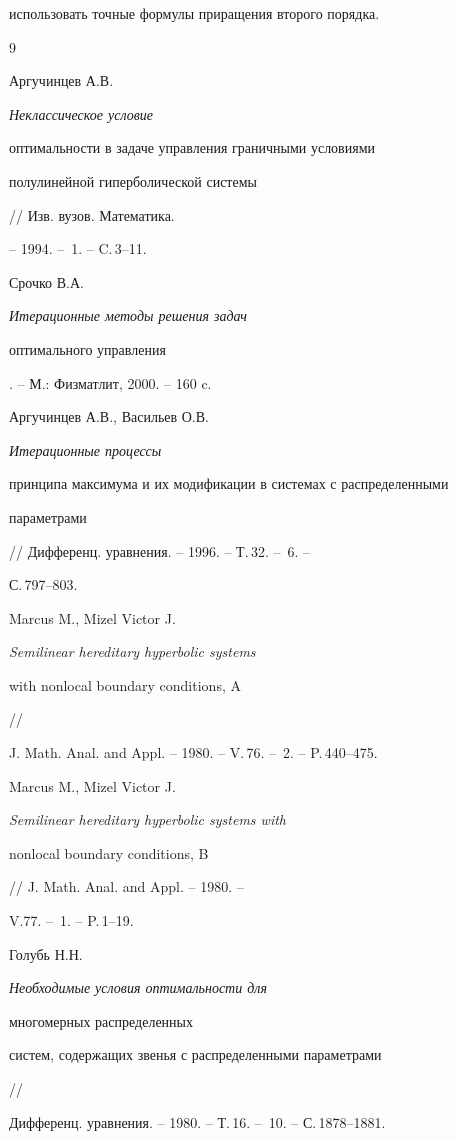 использовать точные формулы приращения второго порядка.








\begin{thebibliography}{9}







Аргучинцев А.В. {\it Неклассическое условие


оптимальности в задаче управления граничными условиями


полулинейной гиперболической системы} // Изв. вузов. Математика.


-- 1994. -- \No\,1. -- C.\,3--11.




Срочко В.А. {\it Итерационные методы решения задач


оптимального управления}. -- М.: Физ\-мат\-лит, 2000. -- 160 c.




Аргучинцев А.В., Васильев О.В. {\it Итерационные процессы


принципа максимума  и их модификации в системах с распределенными


параметрами} // Дифференц. уравнения. -- 1996. -- Т.\,32. -- \No\,6. --


С.\,797--803.




Marcus M., Mizel Victor J. {\it Semilinear hereditary hyperbolic systems 


with nonlocal boundary conditions, A} //


J. Math. Anal. and Appl. -- 1980. -- V.\,76. -- \No\,2. -- P.\,440--475.




Marcus M., Mizel Victor J. {\it Semilinear hereditary hyperbolic systems with


nonlocal boundary conditions, B} // J. Math. Anal. and Appl. -- 1980. -- 


V.77. -- \No\,1. -- P.\,1--19.




Голубь Н.Н. {\it Необходимые условия оптимальности для


многомерных распределенных


систем, содержащих звенья с распределенными параметрами} //


Дифференц. уравнения. -- 1980. -- Т.\,16. -- \No\,10. -- С.\,1878--1881.



\end{thebibliography}

